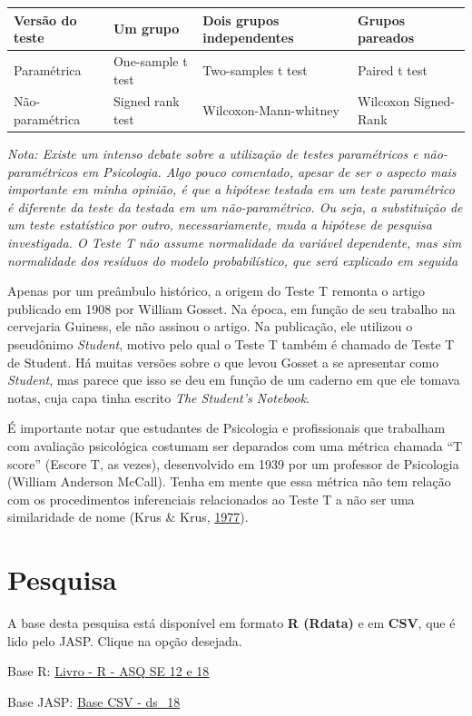 \documentclass[
]{book}
\begin{document}
\begin{longtable}[]{@{}llll@{}}
\toprule
Versão do teste & Um grupo & Dois grupos independentes & Grupos
pareados\tabularnewline
\midrule
\endhead
Paramétrica & One-sample t test & Two-samples t test & Paired t
test\tabularnewline
Não-paramétrica & Signed rank test & Wilcoxon-Mann-whitney & Wilcoxon
Signed-Rank\tabularnewline
\bottomrule
\end{longtable}

\emph{Nota: Existe um intenso debate sobre a utilização de testes
paramétricos e não-paramétricos em Psicologia. Algo pouco comentado,
apesar de ser o aspecto mais importante em minha opinião, é que a
hipótese testada em um teste paramétrico é diferente da teste da testada
em um não-paramétrico. Ou seja, a substituição de um teste estatístico
por outro, necessariamente, muda a hipótese de pesquisa investigada. O
Teste T não assume normalidade da variável dependente, mas sim
normalidade dos resíduos do modelo probabilístico, que será explicado em
seguida}

Apenas por um preâmbulo histórico, a origem do Teste T remonta o artigo
publicado em 1908 por William Gosset. Na época, em função de seu
trabalho na cervejaria Guiness, ele não assinou o artigo. Na publicação,
ele utilizou o pseudônimo \emph{Student}, motivo pelo qual o Teste T
também é chamado de Teste T de Student. Há muitas versões sobre o que
levou Gosset a se apresentar como \emph{Student}, mas parece que isso se
deu em função de um caderno em que ele tomava notas, cuja capa tinha
escrito \emph{The Student's Notebook}.

É importante notar que estudantes de Psicologia e profissionais que
trabalham com avaliação psicológica costumam ser deparados com uma
métrica chamada ``T score'' (Escore T, as vezes), desenvolvido em 1939
por um professor de Psicologia (William Anderson McCall). Tenha em mente
que essa métrica não tem relação com os procedimentos inferenciais
relacionados ao Teste T a não ser uma similaridade de nome (Krus \&
Krus, \protect\hyperlink{ref-Krus1977}{1977}).

\hypertarget{pesquisa-2}{%
\section{Pesquisa}\label{pesquisa-2}}

\begin{base}

A base desta pesquisa está disponível em formato \textbf{R (Rdata)} e em
\textbf{CSV}, que é lido pelo JASP. Clique na opção desejada.

Base R:
\href{https://github.com/anovabr/mqt/raw/master/bases/Livro\%20-\%20R\%20-\%20ASQ\%20SE\%2012\%20e\%2018.RData}{Livro
- R - ASQ SE 12 e 18}

Base JASP:
\href{https://github.com/anovabr/mqt/raw/master/bases/bases_csv_jasp.zip}{Base
CSV - ds\_18}

\end{base}
\end{document}
